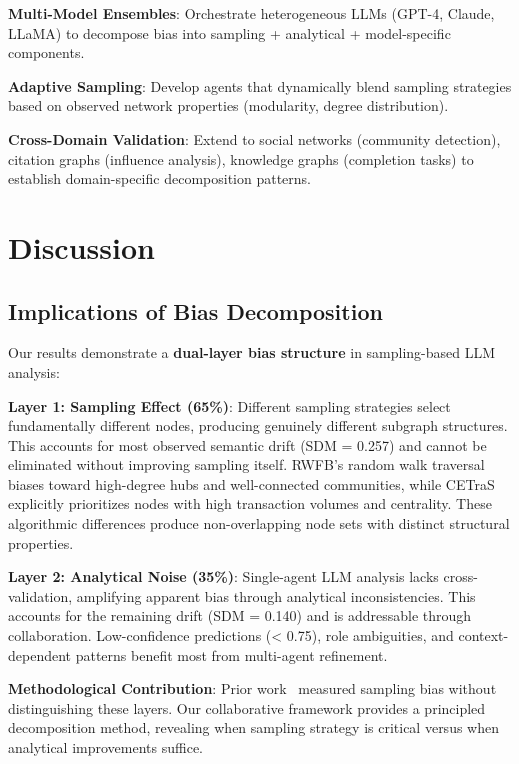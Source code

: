 \documentclass[conference]{IEEEtran}
\begin{document}
\textbf{Multi-Model Ensembles}: Orchestrate heterogeneous LLMs (GPT-4, Claude, LLaMA) to decompose bias into sampling + analytical + model-specific components.

\textbf{Adaptive Sampling}: Develop agents that dynamically blend sampling strategies based on observed network properties (modularity, degree distribution).

\textbf{Cross-Domain Validation}: Extend to social networks (community detection), citation graphs (influence analysis), knowledge graphs (completion tasks) to establish domain-specific decomposition patterns.

\section{Discussion}\label{sec:discussion}

\subsection{Implications of Bias Decomposition}

Our results demonstrate a \textbf{dual-layer bias structure} in sampling-based LLM analysis:

\textbf{Layer 1: Sampling Effect (65\%)}: Different sampling strategies select fundamentally different nodes, producing genuinely different subgraph structures. This accounts for most observed semantic drift (SDM = 0.257) and cannot be eliminated without improving sampling itself. RWFB's random walk traversal biases toward high-degree hubs and well-connected communities, while CETraS explicitly prioritizes nodes with high transaction volumes and centrality. These algorithmic differences produce non-overlapping node sets with distinct structural properties.

\textbf{Layer 2: Analytical Noise (35\%)}: Single-agent LLM analysis lacks cross-validation, amplifying apparent bias through analytical inconsistencies. This accounts for the remaining drift (SDM = 0.140) and is addressable through collaboration. Low-confidence predictions (< 0.75), role ambiguities, and context-dependent patterns benefit most from multi-agent refinement.

\textbf{Methodological Contribution}: Prior work~\cite{lei2025llm,leskovec2006sampling} measured sampling bias without distinguishing these layers. Our collaborative framework provides a principled decomposition method, revealing when sampling strategy is critical versus when analytical improvements suffice.
\end{document}
